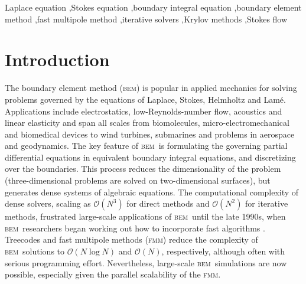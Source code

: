 \documentclass[final,3p,times]{elsarticle}
\newcommand{\bem}{\textsc{bem}\xspace}
\newcommand{\fmm}{\textsc{fmm}\xspace}
\renewcommand{\O}[1]{\mathcal{O}(#1)}
\begin{document}
\begin{frontmatter}
\begin{keyword}
Laplace equation \sep Stokes equation \sep boundary integral equation \sep boundary element method \sep fast multipole method \sep iterative solvers \sep Krylov methods \sep Stokes flow

\end{keyword}

\end{frontmatter}




\section{Introduction}

The boundary element method (\bem) is popular in applied mechanics for solving problems governed by the equations of Laplace, Stokes, Helmholtz and Lam{\'e}. Applications include electrostatics, low-Reynolds-number flow, acoustics and linear elasticity and span all scales from biomolecules, micro-electromechanical and biomedical devices to wind turbines, submarines and  problems in aerospace and geodynamics. The key feature of \bem\ is formulating the governing partial differential equations in equivalent boundary integral equations, and discretizing over the boundaries. This process reduces the dimensionality of the problem (three-dimensional problems are solved on two-dimensional surfaces), but generates dense systems of algebraic equations. 
The computational complexity of dense solvers, scaling as $\O{N^3}$ for direct methods and $\O{N^2}$ for iterative methods, frustrated large-scale applications of \bem\ until the late 1990s, when \bem\ researchers began working out how to incorporate fast algorithms 
\cite{Liu2006}. Treecodes and fast multipole methods (\fmm) reduce the complexity of \bem\ solutions to $\O{N \log N}$ and $\O{N}$, respectively, although often with serious programming effort. Nevertheless, large-scale \bem\ simulations are now possible, especially given the parallel scalability of the \fmm \cite{YokotaETal2011a,YokotaBarba2011a}.
\end{document}
